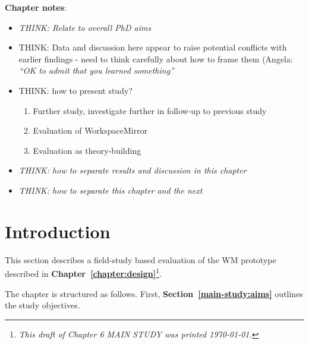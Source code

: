 
\textbf{Chapter notes}:
\begin{itemize}
	\item \textit{THINK: Relate to overall PhD aims}
	\item THINK: Data and discussion here appear to raise potential conflicts with earlier findings - need to think carefully about how to frame them (Angela: \textit{"`OK to admit that you learned something"'}
	\item THINK: how to present study?
	\begin{enumerate}
		\item Further study, investigate further in follow-up to previous study
		\item Evaluation of WorkspaceMirror
		\item Evaluation as theory-building
	\end{enumerate}
	\item \textit{THINK: how to separate results and discussion in this chapter}
	\item \textit{THINK: how to separate this chapter and the next}
\end{itemize}

\section{Introduction}
\label{main-study:introduction}

This section describes a field-study based evaluation of the WM prototype described in  \textbf{Chapter~\ref{chapter:design}}\footnote{\textit{This draft of Chapter 6 MAIN STUDY was printed \today.}}.


The chapter is structured as follows.  First, \textbf{Section~\ref{main-study:aims}} outlines the study objectives.


